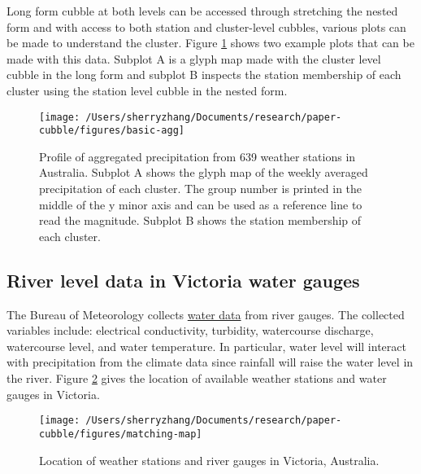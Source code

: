 \documentclass{article}
\begin{document}
Long form cubble at both levels can be accessed through stretching the nested form and with access to both station and cluster-level cubbles, various plots can be made to understand the cluster. Figure \ref{fig:basic-agg} shows two example plots that can be made with this data. Subplot A is a glyph map made with the cluster level cubble in the long form and subplot B inspects the station membership of each cluster using the station level cubble in the nested form.

\begin{figure}
\texttt{[image: /Users/sherryzhang/Documents/research/paper-cubble/figures/basic-agg]} \caption{Profile of aggregated precipitation from 639 weather stations in Australia. Subplot A shows the glyph map of the weekly averaged precipitation of each cluster. The group number is printed in the middle of the y minor axis and can be used as a reference line to read the magnitude. Subplot B shows the station membership of each cluster.}\label{fig:basic-agg}
\end{figure}

\hypertarget{river-level-data-in-victoria-water-gauges}{%
\subsection{River level data in Victoria water gauges}\label{river-level-data-in-victoria-water-gauges}}

The Bureau of Meteorology collects \href{http://www.bom.gov.au/metadata/catalogue/19115/ANZCW0503900528?template=full}{water data} from river gauges. The collected variables include: electrical conductivity, turbidity, watercourse discharge, watercourse level, and water temperature. In particular, water level will interact with precipitation from the climate data since rainfall will raise the water level in the river. Figure \ref{fig:matching-map} gives the location of available weather stations and water gauges in Victoria.

\begin{figure}
\texttt{[image: /Users/sherryzhang/Documents/research/paper-cubble/figures/matching-map]} \caption{Location of weather stations and river gauges in Victoria, Australia.}\label{fig:matching-map}
\end{figure}
\end{document}
